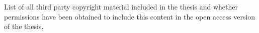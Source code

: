 \documentclass[11pt,a4paper,titlepage,twoside,openright]{style/unimelbthesis}
\begin{document}
\begin{frontmatter}
  \hypersetup{linkcolor=black}
  \setcounter{tocdepth}{2}
  \tableofcontents


  \listoftables


  \listoffigures

\begin{copyrightlist}
  List of all third party copyright material included in the thesis and whether
  permissions have been obtained to include this content in the open access
  version of the thesis.
\end{copyrightlist}
\end{frontmatter}
%
\end{document}
